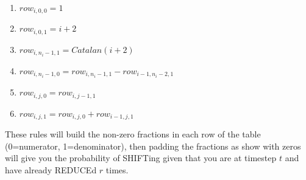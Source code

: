 \documentclass[11pt,a4paper]{article}
\begin{document}
\begin{enumerate}
\item
$row_{i,0,0} = 1$
\item
$row_{i,0,1} = i + 2$
\item
$row_{i,n_i-1,1} = Catalan(i + 2)$
\item
$row_{i,n_i-1,0} = row_{i,n_i-1,1} - row_{i-1,n_i-2,1}$
\item
$row_{i,j,0} = row_{i,j-1,1}$
\item
$row_{i,j,1} = row_{i,j,0} + row_{i-1,j,1}$
\end{enumerate}

These rules will build the non-zero fractions in each row of the table (0=numerator, 1=denominator), then padding the fractions as show with zeros will give you the probability of SHIFTing given that you are at timestep $t$ and have already REDUCEd $r$ times.
\end{document}
